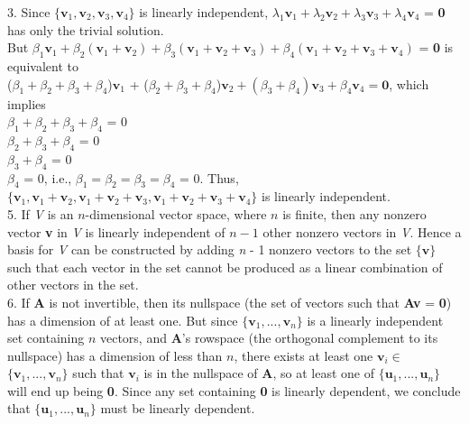 \documentclass{article}
\begin{document}
    3. Since $\{\textbf{v}_1, \textbf{v}_2, \textbf{v}_3, \textbf{v}_4\}$ is linearly independent, $\lambda_1\textbf{v}_1 + \lambda_2\textbf{v}_2 + \lambda_3\textbf{v}_3 + \lambda_4\textbf{v}_4$ = \textbf{0} has only the trivial solution.\\
    But $\beta_1\textbf{v}_1 + \beta_2(\textbf{v}_1 + \textbf{v}_2) + \beta_3(\textbf{v}_1 + \textbf{v}_2 + \textbf{v}_3) + \beta_4(\textbf{v}_1 + \textbf{v}_2 + \textbf{v}_3 + \textbf{v}_4)$ = \textbf{0} is equivalent to\\
    ($\beta_1 + \beta_2 + \beta_3 + \beta_4$)$\textbf{v}_1$ + ($\beta_2 + \beta_3 + \beta_4$)$\textbf{v}_2 + (\beta_3 + \beta_4)\textbf{v}_3 + \beta_4\textbf{v}_4 = \textbf{0}$, which implies\\
  $\beta_1 + \beta_2 + \beta_3 + \beta_4$ = 0\\
  $\beta_2 + \beta_3 + \beta_4$ = 0\\
  $\beta_3 + \beta_4$ = 0\\
  $\beta_4$ = 0, i.e., $\beta_1 = \beta_2 = \beta_3 = \beta_4$ = 0. Thus, $\{\textbf{v}_1, \textbf{v}_1 + \textbf{v}_2, \textbf{v}_1 + \textbf{v}_2 + \textbf{v}_3, \textbf{v}_1 + \textbf{v}_2 + \textbf{v}_3 + \textbf{v}_4\}$ is linearly independent.\\

    5. If \textit{V} is an $n$-dimensional vector space, where $n$ is finite, then any nonzero vector \textbf{v} in \textit{V} is linearly independent of $n - 1$ other nonzero vectors in \textit{V}. Hence a basis for \textit{V} can be constructed by adding \textit{n} - 1 nonzero vectors to the set $\{\textbf{v}\}$ such that each vector in the set cannot be produced as a linear combination of other vectors in the set.\\

    6. If \textbf{A} is not invertible, then its nullspace (the set of vectors such that \textbf{Av} = \textbf{0}) has a dimension of at least one. But since $\{\textbf{v}_1, ..., \textbf{v}_n\}$ is a linearly independent set containing $n$ vectors, and \textbf{A}'s rowspace (the orthogonal complement to its nullspace) has a dimension of less than $n$, there exists at least one $\textbf{v}_i \in$ $\{\textbf{v}_1, ..., \textbf{v}_n\}$ such that $\textbf{v}_i$ is in the nullspace of \textbf{A}, so at least one of $\{\textbf{u}_1, ..., \textbf{u}_n\}$ will end up being \textbf{0}. Since any set containing \textbf{0} is linearly dependent, we conclude that $\{\textbf{u}_1, ..., \textbf{u}_n\}$ must be linearly dependent.\\
\end{document}
